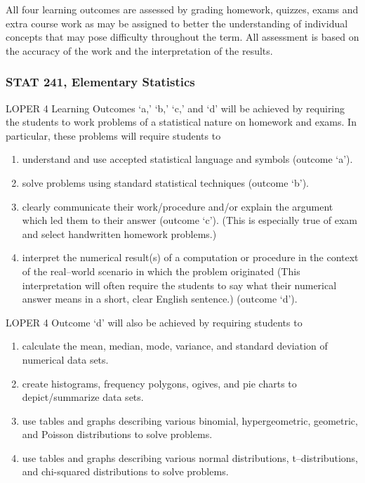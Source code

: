 \documentclass[11pt]{article}
\newenvironment{alphalist}{
\begin{enumerate}[label=(\arabic*),widest=107 ,leftmargin=25pt, itemsep=0pt]}
{\end{enumerate}}
\begin{document}
 
 All four learning outcomes are assessed by grading homework, 
 quizzes, exams and extra course work as may be assigned to 
 better the understanding of individual concepts that may pose 
 difficulty throughout the term.  All assessment is based on the 
 accuracy of the work and the interpretation of the results. 

 \subsubsection{STAT 241,  Elementary Statistics }  
 
 LOPER 4 Learning Outcomes `a,' `b,' `c,' and 
 `d' will be achieved by requiring the students to work problems of 
 a statistical nature on homework and exams.  In particular, 
 these problems will require students to

 \begin{alphalist}
    

    \item understand and use accepted statistical language and 
    symbols (outcome `a').

    \item solve problems using standard statistical techniques 
    (outcome `b'). 

    \item clearly communicate their work/procedure and/or explain 
    the argument which led them to their answer (outcome `c'). 
    (This is especially true of exam and select handwritten 
    homework problems.)

    \item interpret the numerical result(s) of a computation or 
    procedure in the context of the real--world scenario in which 
    the problem originated (This interpretation will often 
    require the students to say what their numerical answer 
    means in a short, clear English sentence.) (outcome `d').   

 \end{alphalist}
LOPER 4 Outcome `d' will also be achieved by requiring students to
\begin{alphalist}

    \item calculate the mean, median, mode, variance, and standard 
    deviation of numerical data sets. 

    \item create histograms, frequency polygons, ogives, and pie 
    charts to depict/summarize data sets. 

    \item use tables and graphs describing various binomial, 
    hypergeometric, geometric, and Poisson distributions to 
    solve problems.

    \item use tables and graphs describing various normal 
    distributions, t--distributions, and chi-squared distributions 
    to solve problems. 
\end{alphalist}
 
\end{document}
